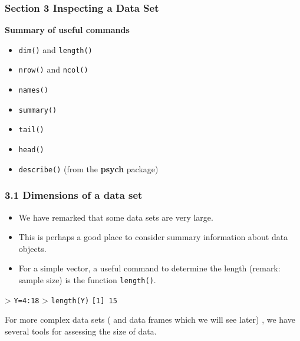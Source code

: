 \documentclass{beamer}
\begin{document}
 	\begin{frame}
 		\frametitle{Section 3 Inspecting a Data Set}
 		\large 
 		\textbf{Summary of useful commands}
 		\begin{itemize}
 			\item \texttt{dim()} and \texttt{length()}
 			\item \texttt{nrow()} and \texttt{ncol()}
 			\item \texttt{names()}
 			\item \texttt{summary()}
 			\item \texttt{tail()}
 			\item \texttt{head()}
 			\item \texttt{describe()} (from the \textbf{psych} package)
 		\end{itemize}
 	\end{frame}
 	\begin{frame}
 		
 		\frametitle{3.1 Dimensions of a data set}
 		\begin{itemize}
 			\item We have remarked that some data sets are very large. 
 			\item This is perhaps a good place to consider
 			summary information about data objects. 
 			\item For a simple vector, a useful command to determine
 			the length (remark: sample size) is the function \texttt{length()}.
 		\end{itemize}
 		\begin{framed}
 			> \texttt{Y=4:18}
 			> \texttt{length(Y)}
 			\texttt{[1] 15}
 			
 		\end{framed}
 		For more complex data sets ( and data frames which we will see later) , we have several
 		tools for assessing the size of data.
 	\end{frame}
\end{document}
